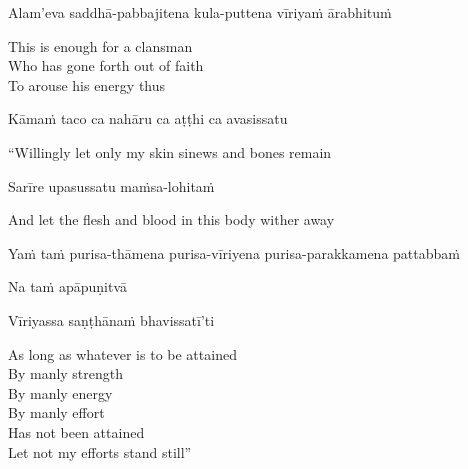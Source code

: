 Alam'eva saddhā-pabbajitena kula-puttena vīriyaṁ ārabhituṁ

\begin{english-verses}
  This is enough for a clansman\\
  Who has gone forth out of faith\\
  To arouse his energy thus
\end{english-verses}

Kāmaṁ taco ca nahāru ca aṭṭhi ca avasissatu

\begin{english}
  ``Willingly let only my skin  sinews  and bones remain
\end{english}

Sarīre upasussatu maṁsa-lohitaṁ

\begin{english}
  And let the flesh and blood in this body wither away
\end{english}

\begin{pali-hang}
  Yaṁ taṁ purisa-thāmena purisa-vīriyena purisa-parakkamena pattabbaṁ\\
\end{pali-hang}
\begin{pali-hangtogether}
  Na taṁ apāpuṇitvā\\
\end{pali-hangtogether}
\begin{pali-hangtogether}
  Vīriyassa saṇṭhānaṁ bhavissatī'ti
\end{pali-hangtogether}

\begin{english-verses}
  As long as whatever is to be attained\\
  By manly strength\\
  By manly energy\\
  By manly effort\makeatletter\hyperlink{endnote87-appendix}\makeatother\\
  Has not been attained\\
  Let not my efforts stand still''
\end{english-verses}

